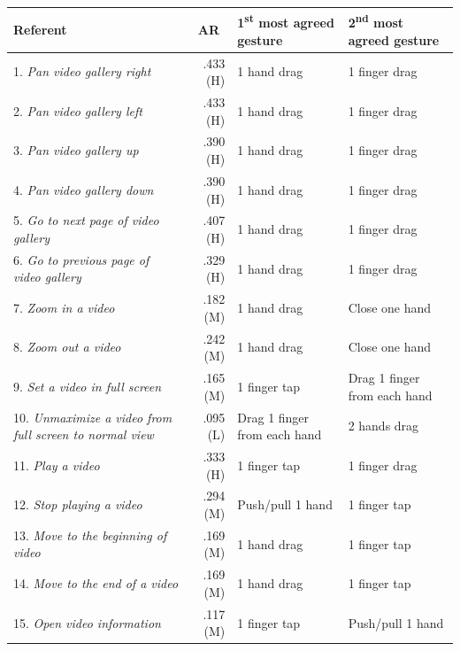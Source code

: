 \begin{table}[ht]
	\renewcommand{\arraystretch}{1.1}
	\captionsetup{justification=centering}
	\footnotesize
	\begin{tabular}{p{3.35cm}rp{2.875cm}p{2.975cm}}
		\toprule
		\textbf{Referent} & \multicolumn{1}{c}{\textbf{AR}} & \textbf{1\textsuperscript{st} most agreed gesture} & \textbf{2\textsuperscript{nd} most agreed gesture} \\
		\midrule
		1. \textit{Pan video gallery right} & \cellcolor{graybluebrighter} .433 (H) & 1 hand drag & 1 finger drag\\
        2. \textit{Pan video gallery left} & \cellcolor{graybluebrighter} .433 (H) & 1 hand drag & 1 finger drag\\
        3. \textit{Pan video gallery up} & \cellcolor{graybluebrighter} .390 (H) & 1 hand drag & 1 finger drag\\
        4. \textit{Pan video gallery down} & \cellcolor{graybluebrighter} .390 (H) & 1 hand drag & 1 finger drag\\
        5. \textit{Go to next page of video gallery} & \cellcolor{graybluebrighter} .407 (H) & 1 hand drag & 1 finger drag\\
        6. \textit{Go to previous page of video gallery} & \cellcolor{graybluebrighter} .329 (H) & 1 hand drag & 1 finger drag\\
        7. \textit{Zoom in a video} & .182 (M) & 1 hand drag & Close one hand\\
        8. \textit{Zoom out a video} & \cellcolor{graybluebrighter} .242 (M) & 1 hand drag & Close one hand\\
        9. \textit{Set a video in full screen} & .165 (M) & 1 finger tap & Drag 1 finger from each hand\\
        10. \textit{Unmaximize a video from full screen to normal view} & .095 (L) & Drag 1 finger from each hand & 2 hands drag\\
        11. \textit{Play a video} & \cellcolor{graybluebrighter} .333 (H) & 1 finger tap & 1 finger drag\\
        12. \textit{Stop playing a video} & \cellcolor{graybluebrighter} .294 (M) & Push/pull 1 hand & 1 finger tap\\
        13. \textit{Move to the beginning of video} & .169 (M) & 1 hand drag & 1 finger tap\\
        14. \textit{Move to the end of a video} & .169 (M) & 1 hand drag & 1 finger tap\\
        15. \textit{Open video information} & .117 (M) & 1 finger tap & Push/pull 1 hand\\

\end{tabular}
\end{table}
